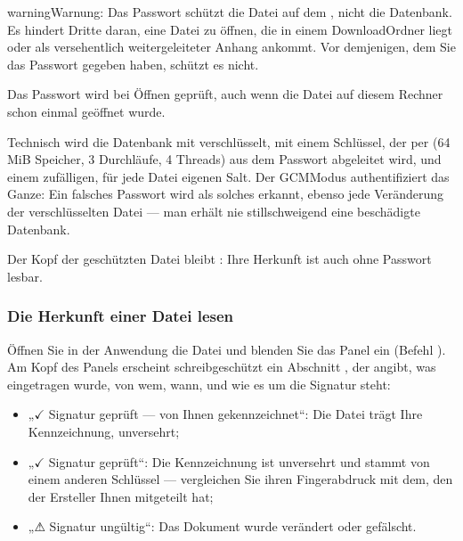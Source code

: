 \documentclass[letterpaper,10pt,german]{sphinxmanual}
\begin{document}
\begin{sphinxadmonition}{warning}{Warnung:}
\sphinxAtStartPar
Das Passwort schützt die Datei auf dem , nicht die Datenbank. Es hindert Dritte daran, eine Datei zu öffnen, die in einem Download\sphinxhyphen{}Ordner liegt oder als versehentlich weitergeleiteter Anhang ankommt. Vor demjenigen, dem Sie das Passwort gegeben haben, schützt es nicht.
\end{sphinxadmonition}

\sphinxAtStartPar
Das Passwort wird bei  Öffnen geprüft, auch wenn die Datei auf diesem Rechner schon einmal geöffnet wurde.

\sphinxAtStartPar
Technisch wird die Datenbank mit  verschlüsselt, mit einem Schlüssel, der per  (64 MiB Speicher, 3 Durchläufe, 4 Threads) aus dem Passwort abgeleitet wird, und einem zufälligen, für jede Datei eigenen Salt. Der GCM\sphinxhyphen{}Modus authentifiziert das Ganze: Ein falsches Passwort wird als solches erkannt, ebenso jede Veränderung der verschlüsselten Datei — man erhält nie stillschweigend eine beschädigte Datenbank.

\sphinxAtStartPar
Der Kopf der geschützten Datei bleibt : Ihre Herkunft ist auch ohne Passwort lesbar.


\subsubsection{Die Herkunft einer Datei lesen}
\label{\detokenize{manuel:lire-l-origine-d-un-fichier}}
\sphinxAtStartPar
Öffnen Sie in der Anwendung die Datei und blenden Sie das Panel  ein (Befehl ). Am Kopf des Panels erscheint schreibgeschützt ein Abschnitt , der angibt, was eingetragen wurde, von wem, wann, und wie es um die Signatur steht:
\begin{itemize}
\item {} 
\sphinxAtStartPar
„\(\checkmark\) Signatur geprüft — von Ihnen gekennzeichnet“: Die Datei trägt Ihre Kennzeichnung, unversehrt;

\item {} 
\sphinxAtStartPar
„\(\checkmark\) Signatur geprüft“: Die Kennzeichnung ist unversehrt und stammt von einem anderen Schlüssel — vergleichen Sie ihren Fingerabdruck mit dem, den der Ersteller Ihnen mitgeteilt hat;

\item {} 
\sphinxAtStartPar
„⚠ Signatur ungültig“: Das Dokument wurde verändert oder gefälscht.

\end{itemize}
\end{document}
